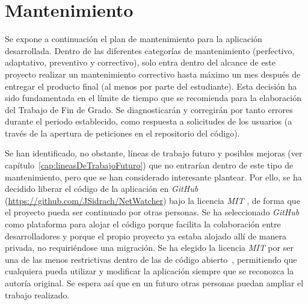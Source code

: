 \chapter{Mantenimiento\label{cap:mantenimiento}}

Se expone a continuación el plan de mantenimiento para la aplicación desarrollada.
Dentro de las diferentes categorías de mantenimiento (perfectivo, adaptativo, preventivo y correctivo), solo entra dentro del alcance de este proyecto realizar un mantenimiento correctivo hasta máximo un mes después de entregar el producto final (al menos por parte del estudiante).
Esta decisión ha sido fundamentada en el límite de tiempo que se recomienda para la elaboración del Trabajo de Fin de Grado.
Se diagnosticarán y corregirán por tanto errores durante el periodo establecido, como respuesta a solicitudes de los usuarios (a través de la apertura de peticiones en el repositorio del código).

Se han identificado, no obstante, líneas de trabajo futuro y posibles mejoras (ver capítulo~\ref{cap:lineasDeTrabajoFuturo}) que no entrarían dentro de este tipo de mantenimiento, pero que se han considerado interesante plantear.
Por ello, se ha decidido liberar el código de la aplicación en \textit{GitHub} (\url{https://github.com/JSidrach/NetWatcher}) bajo la licencia \textit{MIT} \cite{mit}, de forma que el proyecto pueda ser continuado por otras personas.
Se ha seleccionado \textit{GitHub} como plataforma para alojar el código porque facilita la colaboración entre desarrolladores y porque el propio proyecto ya estaba alojado allí de manera privada, no requiriéndose una migración.
Se ha elegido la licencia \textit{MIT} por ser una de las menos restrictivas dentro de las de código abierto~\cite{licenses}, permitiendo que cualquiera pueda utilizar y modificar la aplicación siempre que se reconozca la autoría original.
Se espera así que en un futuro otras personas puedan ampliar el trabajo realizado.

